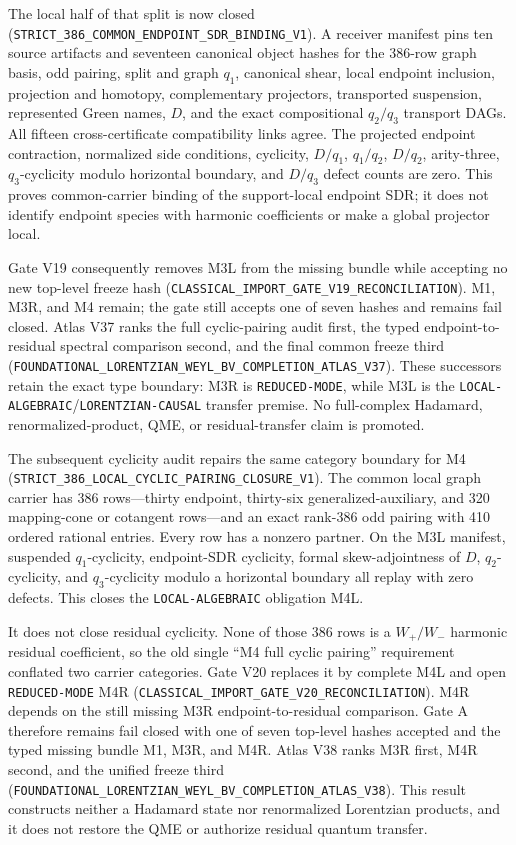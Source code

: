 \documentclass[11pt]{article}
\theoremstyle{definition}
\theoremstyle{remark}
\newcommand{\cert}[1]{\nolinkurl{#1}}
\newcommand{\rtype}[1]{\nolinkurl{#1}}
\begin{document}
The local half of that split is now closed
(\cert{STRICT_386_COMMON_ENDPOINT_SDR_BINDING_V1}).  A receiver manifest pins
ten source artifacts and seventeen canonical object hashes for the 386-row
graph basis, odd pairing, split and graph \(q_1\), canonical shear, local
endpoint inclusion, projection and homotopy, complementary projectors,
transported suspension, represented Green names, \(D\), and the exact
compositional \(q_2/q_3\) transport DAGs.  All fifteen cross-certificate
compatibility links agree.  The projected endpoint contraction, normalized
side conditions, cyclicity, \(D/q_1\), \(q_1/q_2\), \(D/q_2\), arity-three,
\(q_3\)-cyclicity modulo horizontal boundary, and \(D/q_3\) defect counts are
zero.  This proves common-carrier binding of the support-local endpoint SDR; it
does not identify endpoint species with harmonic coefficients or make a global
projector local.

Gate V19 consequently removes M3L from the missing bundle while accepting no
new top-level freeze hash
(\cert{CLASSICAL_IMPORT_GATE_V19_RECONCILIATION}).  M1, M3R, and M4 remain;
the gate still accepts one of seven hashes and remains fail closed.  Atlas V37
ranks the full cyclic-pairing audit first, the typed endpoint-to-residual
spectral comparison second, and the final common freeze third
(\cert{FOUNDATIONAL_LORENTZIAN_WEYL_BV_COMPLETION_ATLAS_V37}).  These
successors retain the exact type boundary: M3R is \rtype{REDUCED-MODE}, while
M3L is the \rtype{LOCAL-ALGEBRAIC}/\rtype{LORENTZIAN-CAUSAL} transfer premise.
No full-complex Hadamard, renormalized-product, QME, or residual-transfer claim
is promoted.

The subsequent cyclicity audit repairs the same category boundary for M4
(\cert{STRICT_386_LOCAL_CYCLIC_PAIRING_CLOSURE_V1}).  The common local graph
carrier has 386 rows---thirty endpoint, thirty-six generalized-auxiliary, and
320 mapping-cone or cotangent rows---and an exact rank-386 odd pairing with 410
ordered rational entries.  Every row has a nonzero partner.  On the M3L
manifest, suspended \(q_1\)-cyclicity, endpoint-SDR cyclicity, formal
skew-adjointness of \(D\), \(q_2\)-cyclicity, and \(q_3\)-cyclicity modulo a
horizontal boundary all replay with zero defects.  This closes the
\rtype{LOCAL-ALGEBRAIC} obligation M4L.

It does not close residual cyclicity.  None of those 386 rows is a
\(W_+/W_-\) harmonic residual coefficient, so the old single
``M4 full cyclic pairing'' requirement conflated two carrier categories.  Gate
V20 replaces it by complete M4L and open \rtype{REDUCED-MODE} M4R
(\cert{CLASSICAL_IMPORT_GATE_V20_RECONCILIATION}).  M4R depends on the still
missing M3R endpoint-to-residual comparison.  Gate A therefore remains fail
closed with one of seven top-level hashes accepted and the typed missing bundle
M1, M3R, and M4R.  Atlas V38 ranks M3R first, M4R second, and the unified
freeze third
(\cert{FOUNDATIONAL_LORENTZIAN_WEYL_BV_COMPLETION_ATLAS_V38}).  This result
constructs neither a Hadamard state nor renormalized Lorentzian products, and
it does not restore the QME or authorize residual quantum transfer.
\end{document}
